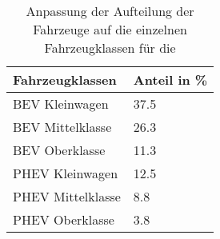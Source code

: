 {
\renewcommand{\arraystretch}{1.2}%
\begin{table}[H]
	\begin{center}
		\caption{Anpassung der Aufteilung der Fahrzeuge auf die einzelnen Fahrzeugklassen für die \Kleinwagendot}
		\begin{tabu} to 0.6\textwidth {X[1] X[1, r]}
			\hline
			Fahrzeugklassen   & Anteil in \si{\percent} \\ \hline
			BEV Kleinwagen    & \num{37.5}              \\
			BEV Mittelklasse  & \num{26.3}              \\
			BEV Oberklasse    & \num{11.3}              \\
			PHEV Kleinwagen   & \num{12.5}              \\
			PHEV Mittelklasse & \num{8.8}               \\
			PHEV Oberklasse   & \num{3.8}               \\ \hline
		\end{tabu}
		\label{tab:CarSplitSzenarette}
	\end{center}
	\vspace{-3mm}%
\end{table}
}